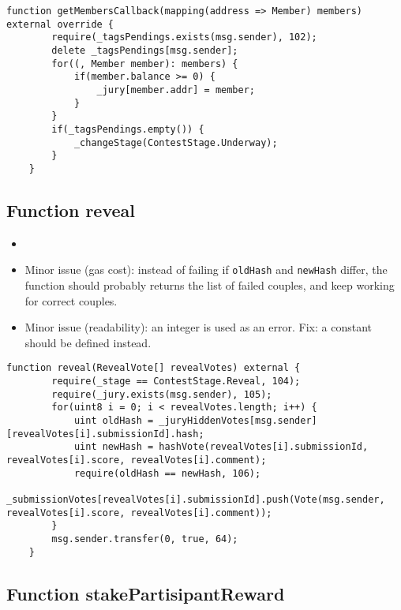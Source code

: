 \begin{lstlisting}[firstnumber=87]
    function getMembersCallback(mapping(address => Member) members) external override {
        require(_tagsPendings.exists(msg.sender), 102);
        delete _tagsPendings[msg.sender];
        for((, Member member): members) {
            if(member.balance >= 0) {
                _jury[member.addr] = member;
            }
        }
        if(_tagsPendings.empty()) {
            _changeStage(ContestStage.Underway);
        }
    }
\end{lstlisting}

\subsection{Function reveal}

\begin{itemize}
\item {}
\item Minor issue (gas cost): instead of failing if {\tt oldHash} and
  {\tt newHash} differ, the function should probably returns the list
  of failed couples, and keep working for correct couples.
\item Minor issue (readability): an integer is used as an error. Fix:
  a constant should be defined instead.
\end{itemize}

\begin{lstlisting}[firstnumber=155]
    function reveal(RevealVote[] revealVotes) external {
        require(_stage == ContestStage.Reveal, 104);
        require(_jury.exists(msg.sender), 105);
        for(uint8 i = 0; i < revealVotes.length; i++) {
            uint oldHash = _juryHiddenVotes[msg.sender][revealVotes[i].submissionId].hash;
            uint newHash = hashVote(revealVotes[i].submissionId, revealVotes[i].score, revealVotes[i].comment);
            require(oldHash == newHash, 106);
            _submissionVotes[revealVotes[i].submissionId].push(Vote(msg.sender, revealVotes[i].score, revealVotes[i].comment));
        }
        msg.sender.transfer(0, true, 64);
    }
\end{lstlisting}

\subsection{Function stakePartisipantReward}

